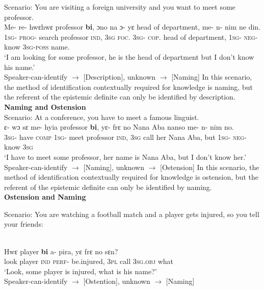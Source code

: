 \documentclass[output=paper,modfonts,nonflat,draftmode]{langsci/langscibook}
\begin{document}
Scenario: You are visiting a foreign university and you want to meet some professor. 
\ea\label{owusu:ex45}\\
\gll Me- re- hwεhwε professor \textbf{bi}, ɔno na ɔ- yε head of department, me- n- nim ne din.\\
\textsc{1sg}- \textsc{prog}- search professor \textsc{ind}, \textsc{3sg} \textsc{foc}. \textsc{3sg}- \textsc{cop}. head of department, \textsc{1sg}- \textsc{neg}- know \textsc{3sg}-\textsc{poss} name.\\
\glt `I am looking for some professor, he is the head of department but I don't know his name.'\\
	Speaker-can-identify $\rightarrow$ [Description], unknown $\rightarrow$  [Naming]
 \z  In this scenario, the method of identification contextually required for knowledge is naming, but the referent of the epistemic definite can only be identified by description. \\
\textbf{Naming and Ostension}\\
Scenario: At a conference, you have to meet a famous linguist.
\ea\label{owusu:ex45}\\
\gll ε- wɔ  sε me- hyia professor \textbf{bi}, yε- frε no Nana Aba nanso me- n- nim no.\\
\textsc{3sg}- have \textsc{comp} \textsc{1sg}- meet professor \textsc{ind}, \textsc{3sg} call her Nana Aba, but \textsc{1sg}- \textsc{neg}- know \textsc{3sg}\\
\glt `I have to meet some professor, her name is Nana Aba, but I don't know her.'\\
	Speaker-can-identify $\rightarrow$ [Naming], unknown $\rightarrow$  [Ostension]
 \z In this scenario, the method of identification contextually required for knowledge is ostension, but the referent of the epistemic definite can only be identified by naming. \\

\textbf{Ostension and Naming}

 Scenario: You are watching a football match and a player gets injured, so you tell your friends:

 \ea\label{owusu:ex45}\\
\gll Hwε player \textbf{bi} a- pira, yε frε no sεn?\\
look player  \textsc{ind} \textsc{perf}- be.injured, \textsc{3pl} call \textsc{3sg}.\textsc{obj} what\\
\glt `Look, some player is injured, what is his name?'\\
	Speaker-can-identify $\rightarrow$ [Ostention], unknown $\rightarrow$  [Naming]
\end{document}
